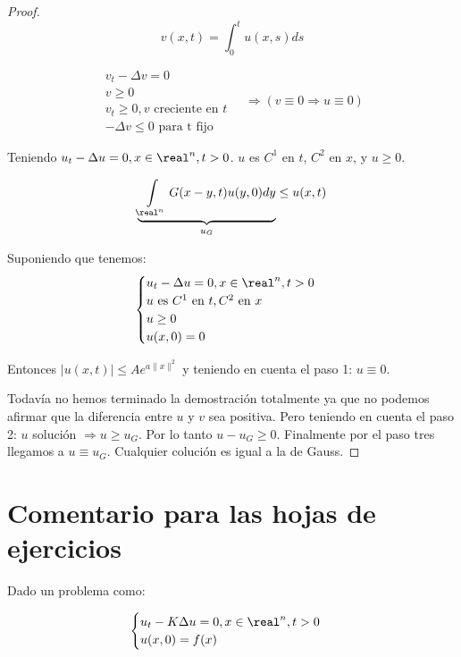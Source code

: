 			\begin{proof}

					\[v(x,t) = \int_0^t u(x,s) ds\]

					\[ \begin{array}{l}
						v_t - \Delta v = 0\\
						v \geq 0\\
						v_t \geq 0, v \text{ creciente en } t\\
						-\Delta v \leq 0 \text{ para t fijo}
					\end{array} \quad \Rightarrow (v \equiv 0 \Rightarrow u \equiv 0) \]


					Teniendo $u_t - \Delta u = 0, x \in \real^n, t > 0$. $u$ es $C^1$ en $t$, $C^2$ en $x$, y $u \geq 0$.

					\[ \underbrace{\int\limits_{\real^n} G(x-y,t) u(y,0) dy}_{u_G} \leq u(x,t) \]


					Suponiendo que tenemos: \[
					\begin{cases}
						u_t - \Delta u = 0, x \in \real^n, t > 0\\
						u \text{ es } C^1 \text{ en } t, C^2 \text{ en } x\\
						u \geq 0\\
						u(x,0) = 0
					\end{cases}\]

					Entonces $|u(x,t)| \leq A e^{a\|x\|^2}$ y teniendo en cuenta el paso 1: $u \equiv 0$.


				Todavía no hemos terminado la demostración totalmente ya que no podemos afirmar que la diferencia entre $u$ y $v$ sea positiva. Pero teniendo en cuenta el paso 2: $u$ solución $\Rightarrow u \geq u_G$. Por lo tanto $u - u_G \geq 0$. Finalmente por el paso tres llegamos a $u \equiv u_G$. Cualquier colución es igual a la de Gauss.

			\end{proof}


\section*{Comentario para las hojas de ejercicios}

Dado un problema como:

\[\begin{cases}
	u_t - K \Delta u = 0, x \in \real^n, t > 0 \\
	u(x,0) = f(x)
\end{cases}\]

